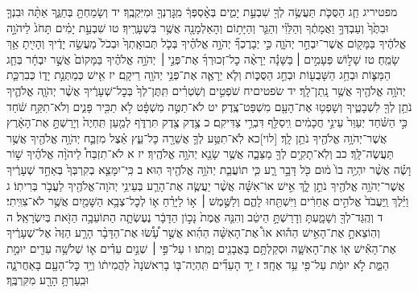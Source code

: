 \documentclass[twoside, openany, parskip=half, 11pt]{book}
\begin{document}
מפטיריג חַ֧ג הַסֻּכֹּ֛ת תַּעֲשֶׂ֥ה לְךָ֖ שִׁבְעַ֣ת יָמִ֑ים בְּאׇ֨סְפְּךָ֔ מִֽגׇּרְנְךָ֖ וּמִיִּקְבֶֽךָ׃ יד וְשָׂמַחְתָּ֖ בְּחַגֶּ֑ךָ אַתָּ֨ה וּבִנְךָ֤ וּבִתֶּ֙ךָ֙ וְעַבְדְּךָ֣ וַאֲמָתֶ֔ךָ וְהַלֵּוִ֗י וְהַגֵּ֛ר וְהַיָּת֥וֹם וְהָאַלְמָנָ֖ה אֲשֶׁ֥ר בִּשְׁעָרֶֽיךָ׃ טו שִׁבְעַ֣ת יָמִ֗ים תָּחֹג֙ לַיהֹוָ֣ה אֱלֹהֶ֔יךָ בַּמָּק֖וֹם אֲשֶׁר־יִבְחַ֣ר יְהֹוָ֑ה כִּ֣י יְבָרֶכְךָ֞ יְהֹוָ֣ה אֱלֹהֶ֗יךָ בְּכֹ֤ל תְּבוּאָֽתְךָ֙ וּבְכֹל֙ מַעֲשֵׂ֣ה יָדֶ֔יךָ וְהָיִ֖יתָ אַ֥ךְ שָׂמֵֽחַ׃ טז שָׁל֣וֹשׁ פְּעָמִ֣ים ׀ בַּשָּׁנָ֡ה יֵרָאֶ֨ה כׇל־זְכוּרְךָ֜ אֶת־פְּנֵ֣י ׀ יְהֹוָ֣ה אֱלֹהֶ֗יךָ בַּמָּקוֹם֙ אֲשֶׁ֣ר יִבְחָ֔ר בְּחַ֧ג הַמַּצּ֛וֹת וּבְחַ֥ג הַשָּׁבֻע֖וֹת וּבְחַ֣ג הַסֻּכּ֑וֹת וְלֹ֧א יֵרָאֶ֛ה אֶת־פְּנֵ֥י יְהֹוָ֖ה רֵיקָֽם׃ יז אִ֖ישׁ כְּמַתְּנַ֣ת יָד֑וֹ כְּבִרְכַּ֛ת יְהֹוָ֥ה אֱלֹהֶ֖יךָ אֲשֶׁ֥ר נָֽתַן־לָֽךְ׃
יד שֹפטיםיח שֹׁפְטִ֣ים וְשֹֽׁטְרִ֗ים תִּֽתֶּן־לְךָ֙ בְּכׇל־שְׁעָרֶ֔יךָ אֲשֶׁ֨ר יְהֹוָ֧ה אֱלֹהֶ֛יךָ נֹתֵ֥ן לְךָ֖ לִשְׁבָטֶ֑יךָ וְשָׁפְט֥וּ אֶת־הָעָ֖ם מִשְׁפַּט־צֶֽדֶק׃ יט לֹא־תַטֶּ֣ה מִשְׁפָּ֔ט לֹ֥א תַכִּ֖יר פָּנִ֑ים וְלֹא־תִקַּ֣ח שֹׁ֔חַד כִּ֣י הַשֹּׁ֗חַד יְעַוֵּר֙ עֵינֵ֣י חֲכָמִ֔ים וִֽיסַלֵּ֖ף דִּבְרֵ֥י צַדִּיקִֽם׃ כ צֶ֥דֶק צֶ֖דֶק תִּרְדֹּ֑ף לְמַ֤עַן תִּֽחְיֶה֙ וְיָרַשְׁתָּ֣ אֶת־הָאָ֔רֶץ אֲשֶׁר־יְהֹוָ֥ה אֱלֹהֶ֖יךָ נֹתֵ֥ן לָֽךְ׃
[לוי]כא לֹֽא־תִטַּ֥ע לְךָ֛ אֲשֵׁרָ֖ה כָּל־עֵ֑ץ אֵ֗צֶל מִזְבַּ֛ח יְהֹוָ֥ה אֱלֹהֶ֖יךָ אֲשֶׁ֥ר תַּעֲשֶׂה־לָּֽךְ׃ כב וְלֹֽא־תָקִ֥ים לְךָ֖ מַצֵּבָ֑ה אֲשֶׁ֥ר שָׂנֵ֖א יְהֹוָ֥ה אֱלֹהֶֽיךָ׃
יז א לֹא־תִזְבַּח֩ לַיהֹוָ֨ה אֱלֹהֶ֜יךָ שׁ֣וֹר וָשֶׂ֗ה אֲשֶׁ֨ר יִהְיֶ֥ה בוֹ֙ מ֔וּם כֹּ֖ל דָּבָ֣ר רָ֑ע כִּ֧י תוֹעֲבַ֛ת יְהֹוָ֥ה אֱלֹהֶ֖יךָ הֽוּא׃
ב כִּֽי־יִמָּצֵ֤א בְקִרְבְּךָ֙ בְּאַחַ֣ד שְׁעָרֶ֔יךָ אֲשֶׁר־יְהֹוָ֥ה אֱלֹהֶ֖יךָ נֹתֵ֣ן לָ֑ךְ אִ֣ישׁ אוֹ־אִשָּׁ֗ה אֲשֶׁ֨ר יַעֲשֶׂ֧ה אֶת־הָרַ֛ע בְּעֵינֵ֥י יְהֹוָה־אֱלֹהֶ֖יךָ לַעֲבֹ֥ר בְּרִיתֽוֹ׃ ג וַיֵּ֗לֶךְ וַֽיַּעֲבֹד֙ אֱלֹהִ֣ים אֲחֵרִ֔ים וַיִּשְׁתַּ֖חוּ לָהֶ֑ם וְלַשֶּׁ֣מֶשׁ ׀ א֣וֹ לַיָּרֵ֗חַ א֛וֹ לְכׇל־צְבָ֥א הַשָּׁמַ֖יִם אֲשֶׁ֥ר לֹא־צִוִּֽיתִי׃ ד וְהֻֽגַּד־לְךָ֖ וְשָׁמָ֑עְתָּ וְדָרַשְׁתָּ֣ הֵיטֵ֔ב וְהִנֵּ֤ה אֱמֶת֙ נָכ֣וֹן הַדָּבָ֔ר נֶעֶשְׂתָ֛ה הַתּוֹעֵבָ֥ה הַזֹּ֖את בְּיִשְׂרָאֵֽל׃ ה וְהֽוֹצֵאתָ֣ אֶת־הָאִ֣ישׁ הַה֡וּא אוֹ֩ אֶת־הָאִשָּׁ֨ה הַהִ֜וא אֲשֶׁ֣ר עָ֠שׂ֠וּ אֶת־הַדָּבָ֨ר הָרָ֤ע הַזֶּה֙ אֶל־שְׁעָרֶ֔יךָ אֶת־הָאִ֕ישׁ א֖וֹ אֶת־הָאִשָּׁ֑ה וּסְקַלְתָּ֥ם בָּאֲבָנִ֖ים וָמֵֽתוּ׃ ו עַל־פִּ֣י ׀ שְׁנַ֣יִם עֵדִ֗ים א֛וֹ שְׁלֹשָׁ֥ה עֵדִ֖ים יוּמַ֣ת הַמֵּ֑ת לֹ֣א יוּמַ֔ת עַל־פִּ֖י עֵ֥ד אֶחָֽד׃ ז יַ֣ד הָעֵדִ֞ים תִּֽהְיֶה־בּ֤וֹ בָרִאשֹׁנָה֙ לַהֲמִית֔וֹ וְיַ֥ד כׇּל־הָעָ֖ם בָּאַחֲרֹנָ֑ה וּבִֽעַרְתָּ֥ הָרָ֖ע מִקִּרְבֶּֽךָ׃
\end{document}
